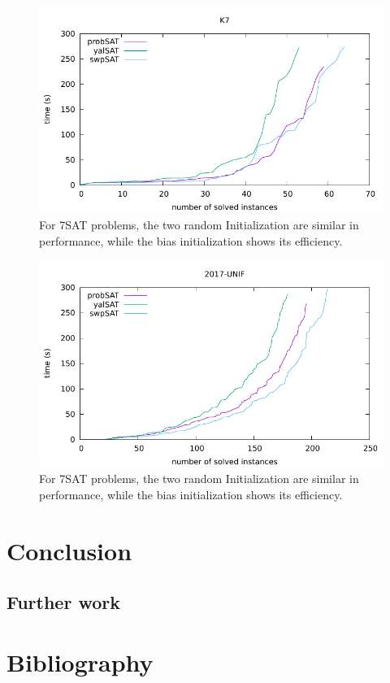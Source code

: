 \documentclass[12pt,a4paper,twoside]{scrartcl}
\numberwithin{equation}{section}
\begin{document}
  \begin{figure}[H]
\begin{center}
  \includegraphics[scale = 1]{DATA/K7/e5.pdf}
  \end{center}
  \caption{For 7SAT problems, the two random Initialization are similar in performance, while the bias initialization shows its efficiency.}
  \label{Experiment 9 k7 cactus plot}
  \end{figure} 
  \begin{figure}[H]
\begin{center}
  \includegraphics[scale = 1]{DATA/UNIF/e5.pdf}
  \end{center}
  \caption{For 7SAT problems, the two random Initialization are similar in performance, while the bias initialization shows its efficiency.}
  \label{Experiment 9 all cactus plot}
  \end{figure} 
\clearpage
\section{Conclusion}
\label{sec:conc}
\subsection{Further work}
\clearpage
\section{Bibliography}


\end{document}
